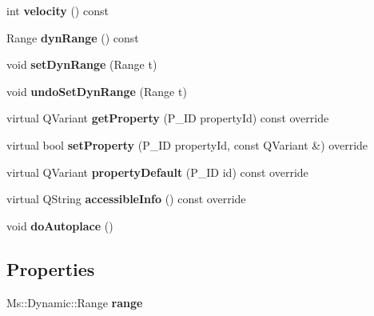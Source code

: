 \begin{DoxyCompactItemize}
\mbox{\label{class_ms_1_1_dynamic_a8a3fa94b3f09ad3102755a34bcb2b473}} 
int {\bfseries velocity} () const
\item 
\mbox{\label{class_ms_1_1_dynamic_a6fb201ebf217e2e3fa56387a4fdf675d}} 
Range {\bfseries dyn\+Range} () const
\item 
\mbox{\label{class_ms_1_1_dynamic_a25939344abcf2cd1e483971c9a1b93ba}} 
void {\bfseries set\+Dyn\+Range} (Range t)
\item 
\mbox{\label{class_ms_1_1_dynamic_aeaed1503fce8c3461e8b395246715fdc}} 
void {\bfseries undo\+Set\+Dyn\+Range} (Range t)
\item 
\mbox{\label{class_ms_1_1_dynamic_ac52c44d14fdb9388593c40a920fb4738}} 
virtual Q\+Variant {\bfseries get\+Property} (P\+\_\+\+ID property\+Id) const override
\item 
\mbox{\label{class_ms_1_1_dynamic_a74a03ef9b22b3670b1a6a1702aa16a4e}} 
virtual bool {\bfseries set\+Property} (P\+\_\+\+ID property\+Id, const Q\+Variant \&) override
\item 
\mbox{\label{class_ms_1_1_dynamic_a4f774bc1982c83cd7d2b409d938b3de0}} 
virtual Q\+Variant {\bfseries property\+Default} (P\+\_\+\+ID id) const override
\item 
\mbox{\label{class_ms_1_1_dynamic_ad737f390d867c283af8b311402e1d33e}} 
virtual Q\+String {\bfseries accessible\+Info} () const override
\item 
\mbox{\label{class_ms_1_1_dynamic_ad2b38e501b1eecfed0710fcf7753784e}} 
void {\bfseries do\+Autoplace} ()
\end{DoxyCompactItemize}
\subsection*{Properties}
\begin{DoxyCompactItemize}
\item 
\mbox{\label{class_ms_1_1_dynamic_af7407d2c2469bdcfda355fed4479cd31}} 
Ms\+::\+Dynamic\+::\+Range {\bfseries range}
\end{DoxyCompactItemize}
